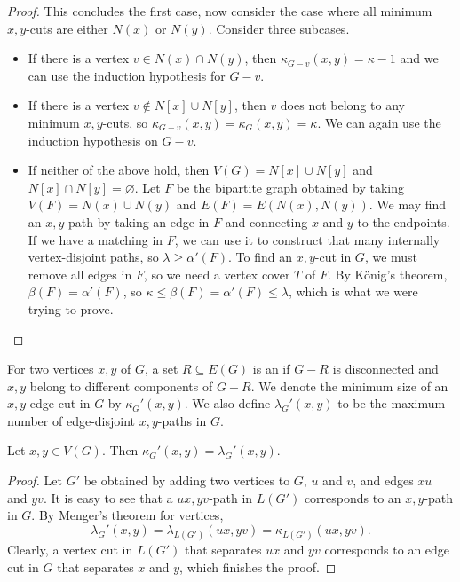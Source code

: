 \begin{proof}
  This concludes the first case, now consider the case where all minimum
  $x,y$-cuts are either $N(x)$ or $N(y)$.
  Consider three subcases.
  \begin{itemize}
  \item If there is a vertex $v \in N(x) \cap N(y)$, then $\kappa_{G - v}(x,y) =
	\kappa-1$ and we can use the induction hypothesis for $G-v$.
  \item If there is a vertex $v \notin N[x] \cup N[y]$, then $v$ does not belong
	to any minimum $x,y$-cuts, so $\kappa_{G-v}(x,y) = \kappa_G(x,y) = \kappa$.
	We can again use the induction hypothesis on $G-v$.
  \item If neither of the above hold, then $V(G) = N[x] \cup N[y]$ and $N[x]
	\cap N[y] = \varnothing$.
	Let $F$ be the bipartite graph obtained by taking $V(F) = N(x) \cup N(y)$
	and $E(F) = E(N(x), N(y))$.
	We may find an $x,y$-path by taking an edge in $F$ and connecting $x$ and
	$y$ to the endpoints.
	If we have a matching in $F$, we can use it to construct that many
	internally vertex-disjoint paths, so $\lambda \ge \alpha'(F)$.
	To find an $x,y$-cut in $G$, we must remove all edges in $F$, so we need a
	vertex cover $T$ of $F$.
	By König's theorem, $\beta(F) = \alpha'(F)$, so $\kappa \le \beta(F) =
	\alpha'(F) \le \lambda$, which is what we were trying to prove.
	\qedhere
  \end{itemize}
\end{proof}


\begin{definition}
  For two vertices $x,y$ of $G$, a set $R \subseteq E(G)$ is an
   if $G-R$ is disconnected and $x,y$ belong to different
  components of $G-R$.
  We denote the minimum size of an $x,y$-edge cut in $G$ by $\kappa_G'(x,y)$.
  We also define $\lambda_G'(x,y)$ to be the maximum number of edge-disjoint
  $x,y$-paths in $G$.
\end{definition}

\begin{theorem}
  Let $x,y \in V(G)$.
  Then $\kappa_G'(x,y) = \lambda_G'(x,y)$.
\end{theorem}

\begin{proof}
  Let $G'$ be obtained by adding two vertices to $G$, $u$ and $v$, and edges
  $xu$ and $yv$.
  It is easy to see that a $ux,yv$-path in $L(G')$ corresponds to an $x,y$-path
  in $G$.
  By Menger's theorem for vertices,
  \[
	\lambda_G'(x,y) = \lambda_{L(G')}(ux,yv) = \kappa_{L(G')}(ux,yv).
  \]
  Clearly, a vertex cut in $L(G')$ that separates $ux$ and $yv$ corresponds to
  an edge cut in $G$ that separates $x$ and $y$, which finishes the proof.
\end{proof}

